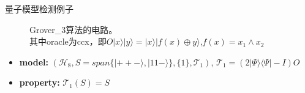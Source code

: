 \documentclass[aspectratio=1610]{ctexbeamer}
\begin{document}
\begin{frame}{量子模型检测例子}
    \begin{figure}[h]
        \centering
        \label{fig:cir}
        \caption{Grover\_3算法的电路。\\其中oracle为ccx，即$O|x\rangle|y\rangle = |x\rangle|f(x)\oplus y\rangle $,$f(x)=x_1\wedge x_2$}
    \end{figure}
    \begin{itemize}
        \item \textbf{model:} $(\mathcal{H}_8, S = span\{|++-\rangle,|11-\rangle\}, \{1\}, {\mathcal{T}_1})$, $\mathcal{T}_1 =(2|\Psi\rangle\langle \Psi| - I)O$ 
        \item \textbf{property:} $\mathcal{T}_1(S)=S$
    \end{itemize}
\end{frame}
\end{document}
